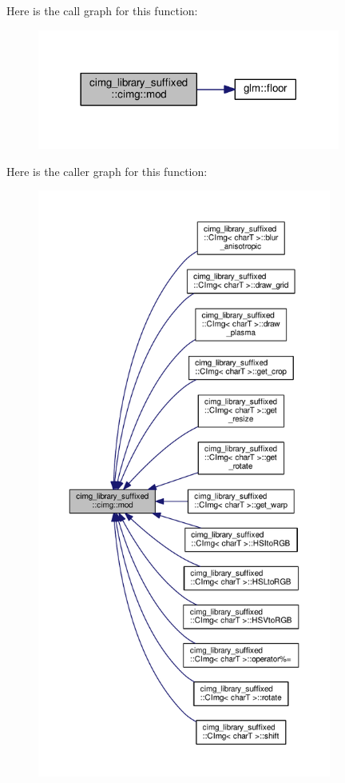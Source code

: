 Here is the call graph for this function\+:
\nopagebreak
\begin{figure}[H]
\begin{center}
\leavevmode
\includegraphics[width=282pt]{d4/d9b/namespacecimg__library__suffixed_1_1cimg_afcc02428c9b7d9100e1674369d25cc40_cgraph}
\end{center}
\end{figure}
Here is the caller graph for this function\+:
\nopagebreak
\begin{figure}[H]
\begin{center}
\leavevmode
\includegraphics[height=550pt]{d4/d9b/namespacecimg__library__suffixed_1_1cimg_afcc02428c9b7d9100e1674369d25cc40_icgraph}
\end{center}
\end{figure}
\mbox{\label{namespacecimg__library__suffixed_1_1cimg_ada686776cc71803df391eea79cd1b3e5}} 
